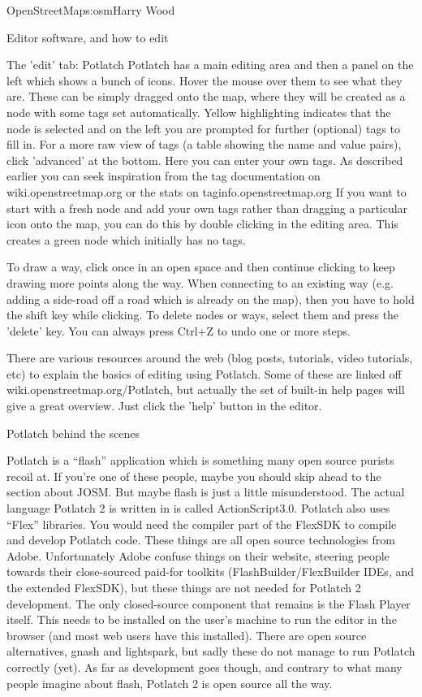 \begin{aosachapter}{OpenStreetMap}{s:osm}{Harry Wood}
\begin{aosasect1}{Editor software, and how to edit}
\begin{aosasect2}{The 'edit' tab: Potlatch}
Potlatch has a main editing area and then a panel on the left which
shows a bunch of icons. Hover the mouse over them to see what they
are. These can be simply dragged onto the map, where they will be
created as a node with some tags set automatically. Yellow
highlighting indicates that the node is selected and on the left you
are prompted for further (optional) tags to fill in. For a more raw
view of tags (a table showing the name and value pairs), click
'advanced' at the bottom. Here you can enter your own tags. As
described earlier you can seek inspiration from the tag documentation
on wiki.openstreetmap.org or the stats on taginfo.openstreetmap.org If
you want to start with a fresh node and add your own tags rather than
dragging a particular icon onto the map, you can do this by double
clicking in the editing area. This creates a green node which
initially has no tags.

To draw a way, click once in an open space and then continue clicking
to keep drawing more points along the way. When connecting to an
existing way (e.g. adding a side-road off a road which is already on
the map), then you have to hold the shift key while clicking. To
delete nodes or ways, select them and press the 'delete' key. You can
always press Ctrl+Z to undo one or more steps.

There are various resources around the web (blog posts, tutorials,
video tutorials, etc) to explain the basics of editing using
Potlatch. Some of these are linked off
wiki.openstreetmap.org/Potlatch, but actually the set of built-in help
pages will give a great overview. Just click the 'help' button in the
editor.

\end{aosasect2}

\begin{aosasect2}{Potlatch behind the scenes}

Potlatch is a ``flash'' application which is something many open
source purists recoil at. If you're one of these people, maybe you
should skip ahead to the section about JOSM. But maybe flash is just a
little misunderstood. The actual language Potlatch 2 is written in is
called ActionScript3.0. Potlatch also uses ``Flex'' libraries. You
would need the compiler part of the FlexSDK to compile and develop
Potlatch code. These things are all open source technologies from
Adobe. Unfortunately Adobe confuse things on their website, steering
people towards their close-sourced paid-for toolkits
(FlashBuilder/FlexBuilder IDEs, and the extended FlexSDK), but these
things are not needed for Potlatch 2 development. The only
closed-source component that remains is the Flash Player itself. This
needs to be installed on the user's machine to run the editor in the
browser (and most web users have this installed). There are open
source alternatives, gnash and lightspark, but sadly these do not
manage to run Potlatch correctly (yet). As far as development goes
though, and contrary to what many people imagine about flash, Potlatch
2 is open source all the way.


\end{aosasect2}
\end{aosasect1}
\end{aosachapter}
